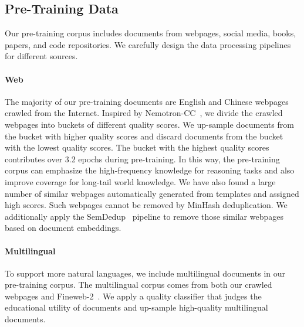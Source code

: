 \documentclass{article}
\theoremstyle{definition}
\begin{document}
\subsection{Pre-Training Data}
Our pre-training corpus includes documents from webpages, social media, books, papers, and code repositories. We carefully design the data processing pipelines for different sources. 

\paragraph{Web} The majority of our pre-training documents are English and Chinese webpages crawled from the Internet. Inspired by Nemotron-CC~\cite{su2024nemotron}, we divide the crawled webpages into buckets of different quality scores. We up-sample documents from the bucket with higher quality scores
and discard documents from the bucket with the lowest quality scores. The bucket with the highest quality scores contributes over 3.2 epochs during pre-training. In this way, the pre-training corpus can emphasize the high-frequency knowledge for reasoning tasks and also improve coverage for long-tail world knowledge. We have also found a large number of similar webpages automatically generated from templates and assigned high scores. Such webpages cannot be removed by MinHash deduplication. We additionally apply the SemDedup~\cite{abbas2023semdedup} pipeline to remove those similar webpages based on document embeddings.

\paragraph{Multilingual} To support more natural languages, we include multilingual documents in our pre-training corpus. The multilingual corpus comes from both our crawled webpages and Fineweb-2~\cite{penedo2025fineweb2}. We apply a quality classifier that judges the educational utility of documents and up-sample high-quality multilingual documents.
\end{document}
